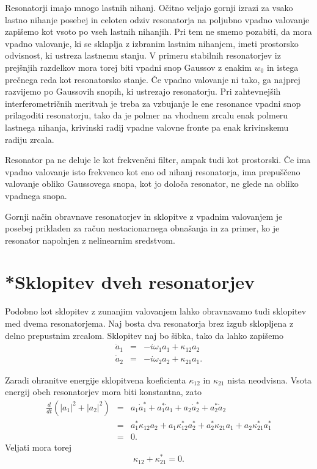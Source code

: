 Resonatorji imajo mnogo lastnih nihanj. Očitno veljajo gornji izrazi
za vsako lastno nihanje posebej in celoten odziv resonatorja na poljubno vpadno
valovanje zapišemo kot vsoto po vseh lastnih nihanjih. Pri tem ne smemo pozabiti,
da mora vpadno valovanje, ki se sklaplja z izbranim lastnim nihanjem,
imeti prostorsko odvisnost, ki ustreza lastnemu stanju. V primeru
stabilnih resonatorjev iz prejšnjih razdelkov mora torej biti vpadni
snop Gaussov z enakim $w_{0}$ in istega prečnega reda kot resonatorsko
stanje. Če vpadno valovanje ni tako, ga najprej razvijemo po
Gaussovih snopih, ki ustrezajo resonatorju.
Pri zahtevnejših interferometričnih meritvah je treba za vzbujanje le ene 
resonance vpadni snop prilagoditi resonatorju, tako da je polmer na vhodnem 
zrcalu enak polmeru lastnega nihanja, krivinski radij vpadne valovne fronte 
pa enak krivinskemu radiju zrcala. 

Resonator pa ne deluje le kot frekvenčni filter, ampak tudi
kot prostorski. Če ima vpadno valovanje isto frekvenco kot
eno od nihanj resonatorja, ima prepuščeno valovanje obliko
Gaussovega snopa, kot jo določa resonator, ne glede na obliko vpadnega
snopa.

Gornji način obravnave resonatorjev in sklopitve z vpadnim valovanjem
je posebej prikladen za račun nestacionarnega obnašanja in za primer,
ko je resonator napolnjen z nelinearnim sredstvom.

\section{*Sklopitev dveh resonatorjev}
Podobno kot sklopitev z zunanjim valovanjem lahko obravnavamo tudi
sklopitev med dvema resonatorjema. Naj bosta dva resonatorja brez izgub
sklopljena z delno prepustnim zrcalom. Sklopitev naj bo šibka, tako da lahko zapišemo 
\begin{eqnarray}
\dot{a}_{1} & = & -i\omega_{1}a_{1}+\kappa_{12}a_{2} \\
\dot{a}_{2} & = & -i\omega_{2}a_{2}+\kappa_{21}a_{1}.
\end{eqnarray}

Zaradi ohranitve energije sklopitvena koeficienta $\kappa_{12}$ in
$\kappa_{21}$ nista neodvisna. Vsota energij obeh resonatorjev mora
biti konstantna, zato 
\begin{eqnarray}
\frac{d}{dt}(|a_{1}|^{2}+|a_{2}|^{2}) & = & a_{1}\dot{a}_{1}^{*}+a_{1}^{*}\dot{a}_{1}+
a_{2}\dot{a}_{2}^{*}+a_{2}^{*}\dot{a}_{2}\nonumber \\
 & = & a_{1}^{*}\kappa_{12}a_{2}+a_{1}\kappa_{12}^{*}a_{2}^{*}+a_{2}^{*}\kappa_{21}a_{1}+
 a_{2}\kappa_{21}^{*}a_{1}^{*}\nonumber \\
 & = & 0.
\end{eqnarray}
Veljati mora torej
\begin{equation}
\kappa_{12}+\kappa_{21}^{*}=0.
\label{3.56}
\end{equation}

